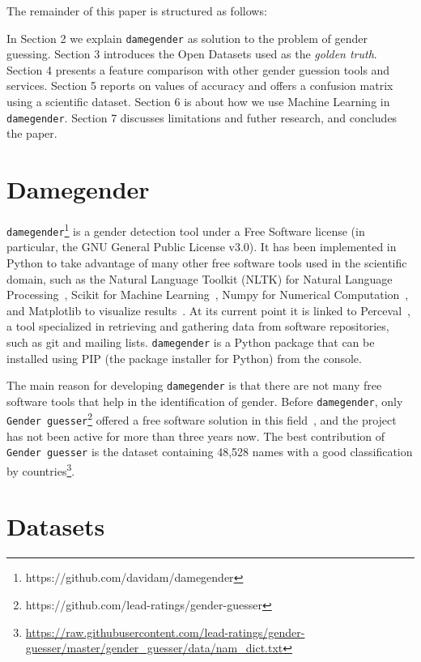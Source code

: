 \documentclass[a4paper]{article}
\begin{document}
The remainder of this paper is structured as follows:

In Section 2 we explain \texttt{damegender} as solution to the
problem of gender guessing. Section 3 introduces the Open Datasets used as the \emph{golden truth}.
Section 4 presents a feature comparison with other gender guession tools and services.
Section 5 reports on values of accuracy and offers a confusion matrix using a scientific dataset.
Section 6 is about how we use Machine Learning in \texttt{damegender}.
Section 7 discusses limitations and futher research, and concludes the paper.

\section{Damegender}

\texttt{damegender}\footnote{https://github.com/davidam/damegender} is a gender detection tool under a Free Software license (in particular, the GNU General Public License v3.0). 
It has been implemented in Python to take advantage of many other free software tools used in the scientific domain, such as the Natural Language Toolkit (NLTK) for Natural Language Processing~\cite{loper2002nltk}, Scikit for Machine Learning~\cite{pedregosa2011scikit}, Numpy for Numerical Computation~\cite{van2011numpy}, and Matplotlib to visualize results~\cite{hunter2007matplotlib}. 
At its current point it is linked to Perceval~\cite{duenas2018perceval}, a tool specialized in retrieving and gathering data from software repositories, such as git and mailing lists.
\texttt{damegender} is a Python package that can be installed using PIP (the package installer for Python) from the console.


The main reason for developing \texttt{damegender} is that there are not many free software tools that help in the identification of gender. Before \texttt{damegender}, only \texttt{Gender guesser}\footnote{https://github.com/lead-ratings/gender-guesser} offered a free software solution in this field~\cite{krawetz2006gender}, and the project has not been active for more than three years now.
The best contribution of \texttt{Gender guesser} is the dataset containing 48,528 names with a good classification by countries\footnote{\url{https://raw.githubusercontent.com/lead-ratings/gender-guesser/master/gender_guesser/data/nam_dict.txt}}.

\section{Datasets}
\end{document}
